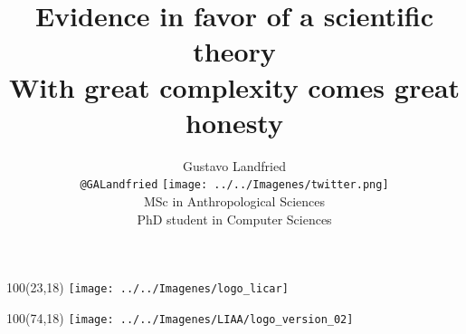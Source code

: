 \documentclass[shownotes]{beamer}
\title[Bayesian inference]{Evidence in favor of a scientific theory\\ \large With great complexity comes great honesty}
\author[Gustavo Landfried]{Gustavo Landfried \\ \scriptsize \texttt{@GALandfried} \texttt{[image: ../../Imagenes/twitter.png]} \\ \vspace{0.2cm} 
MSc in Anthropological Sciences \\
PhD student in Computer Sciences 
\vspace{-0.3cm}}
\institute[DC-ICC-CONICET]{\texttt{[image: ../../Imagenes/dc-logo]}}
\date{}
\begin{document}
\begin{frame}[noframenumbering]
 
 \begin{textblock}{100}(23,18)
 \texttt{[image: ../../Imagenes/logo\_licar]} 
 \end{textblock}
  \begin{textblock}{100}(74,18)
 \texttt{[image: ../../Imagenes/LIAA/logo\_version\_02]} 
 \end{textblock}

\vspace{2.5cm}
\maketitle
 
\end{frame}

\footnotesize
\end{document}
